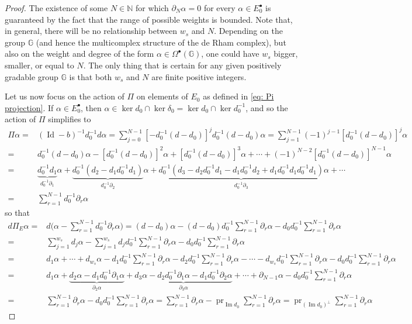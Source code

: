 \documentclass[dvipsnames]{amsart}
\theoremstyle{definition}
\theoremstyle{definition}
\numberwithin{equation}{section}
\newcommand{\N}{\mathbb{N}}
\newcommand{\G}{\mathbb{G}}
\begin{document}
\begin{proof}
The existence of some $N\in\N$ for which $\partial_N\alpha=0$ for every $\alpha\in E_0^\bullet$ is guaranteed by the fact that the range of possible weights is bounded. Note that, in general, there will be no relationship between $w_s$ and $N$. Depending on the group $\G$ (and hence the multicomplex structure of the de Rham complex), but also on the weight and degree of the form $\alpha\in\Omega^\bullet(\G)$, one could have $w_s$ bigger, smaller, or equal to $N$. The only thing that is certain for any given positively gradable group $\G$ is that both $w_s$ and $N$ are finite positive integers.

Let us now focus on the action of $\Pi$ on elements of $E_0$ as defined in \eqref{eq: Pi projection}. If $\alpha\in E_0^\bullet$, then $\alpha\in\ker d_0\cap\ker\delta_0=\ker d_0\cap\ker d_0^{-1}$, and so the action of $\Pi$ simplifies to
\begin{align*}
    \Pi\alpha=&\left(\operatorname{Id}-b\right)^{-1}d_0^{-1}d\alpha=\sum_{j=0}^{N-1}\left[-d_0^{-1}(d-d_0)\right]^jd_0^{-1}(d-d_0)\alpha=\sum_{j=1}^{N-1}(-1)^{j-1}\left[d_0^{-1}(d-d_0)\right]^j\alpha\\=&d_0^{-1}(d-d_0)\alpha-\left[d_0^{-1}(d-d_0)\right]^2\alpha+\left[d_0^{-1}(d-d_0)\right]^3\alpha+\cdots+(-1)^{N-2}\left[d_0^{-1}(d-d_0)\right]^{N-1}\alpha\\=&\underbrace{d_0^{-1}d_1}_{d_0^{-1}\partial_1}\alpha+\underbrace{d_0^{-1}(d_2-d_1d_0^{-1}d_1)}_{d_0^{-1}\partial_2}\alpha+\underbrace{d_0^{-1}\left(d_3-d_2d_0^{-1}d_1-d_1d_0^{-1}d_2+d_1d_0^{-1}d_1d_0^{-1}d_1\right)}_{d_0^{-1}\partial_3}\alpha+\cdots\\=&\sum_{r=1}^{N-1}d_0^{-1}\partial_r\alpha
\end{align*}
so that
\begin{align*}
    d\Pi_E\alpha=&d\bigg(\alpha-\sum_{r=1}^{N-1}d_0^{-1}\partial_r\alpha\bigg)=(d-d_0)\alpha-(d-d_0)d_0^{-1}\sum_{r=1}^{N-1}\partial_r\alpha-d_0d_0^{-1}\sum_{r=1}^{N-1}\partial_r\alpha\\=&\sum_{j=1}^{w_s}d_j\alpha-\sum_{j=1}^{w_s}d_jd_0^{-1}\sum_{r=1}^{N-1}\partial_r\alpha-d_0d_0^{-1}\sum_{r=1}^{N-1}\partial_r\alpha\\=&d_1\alpha+\cdots+d_{w_s}\alpha-d_1d_0^{-1}\sum_{r=1}^{N-1}\partial_r\alpha-d_2d_0^{-1}\sum_{r=1}^{N-1}\partial_r\alpha-\cdots-d_{w_s}d_0^{-1}\sum_{r=1}^{N-1}\partial_r\alpha-d_0d_0^{-1}\sum_{r=1}^{N-1}\partial_r\alpha\\=&d_1\alpha+\underbrace{d_2\alpha-d_1d_0^{-1}\partial_1\alpha}_{\partial_2\alpha}+\underbrace{d_3\alpha-d_2d_0^{-1}\partial_1\alpha-d_1d_0^{-1}\partial_2\alpha}_{\partial_3\alpha}+\cdots+\partial_{N-1}\alpha-d_0d_0^{-1}\sum_{r=1}^{N-1}\partial_r\alpha\\=&\sum_{r=1}^{N-1}\partial_r\alpha-d_0d_0^{-1}\sum_{r=1}^{N-1}\partial_r\alpha=\sum_{r=1}^{N-1}\partial_r\alpha-\operatorname{pr}_{\operatorname{Im}d_0}\sum_{r=1}^{N-1}\partial_r\alpha=\operatorname{pr}_{(\operatorname{Im}d_0)^\perp}\sum_{r=1}^{N-1}\partial_r\alpha

\end{align*}
\end{proof}
\end{document}

